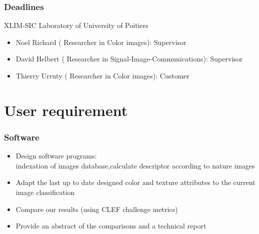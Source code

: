 \documentclass[xcolor=table]{beamer}
\begin{document}
\begin{frame} \frametitle{Deadlines}
XLIM-SIC Laboratory of University of Poitiers
\begin{itemize}
\item Noel Richard ( Researcher in Color images): Supervisor
\item David Helbert ( Researcher in Signal-Image-Communications): Supervisor
\item Thierry Urruty ( Researcher in Color images): Customer
\end{itemize}

\end{frame}

\section{User requirement}
\begin{frame} \frametitle{Software}
\begin{itemize}
 \item Design  software programs:\\
   indexation of  images database,calculate descriptor according to  nature images
\item Adapt the last up to date designed color and texture attributes to the current image classification
\item Compare our results (using CLEF challenge metrics)
\item Provide an abstract of the comparisons and a technical report 
\end{itemize}






\end{frame}
\end{document}
